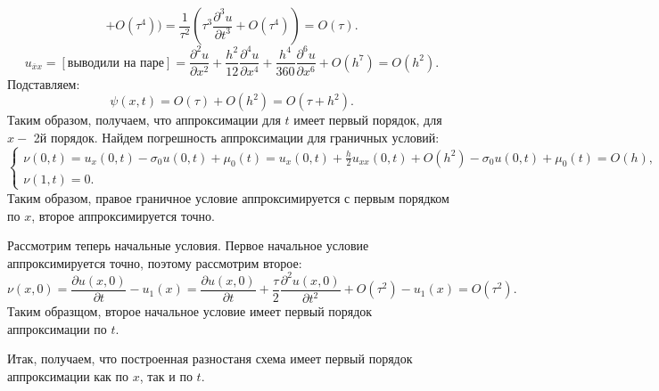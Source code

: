 \documentclass[11pt]{article}
\begin{document}
$$+O(\tau^4))=\frac{1}{\tau^2}(\tau^3\frac{\partial^3 u}{\partial t^3}+O(\tau^4))=O(\tau).$$
$$u_{\overline{x}x}=[\text{выводили на паре}]=\frac{\partial^2 u}{\partial x^2}+\frac{h^2}{12}\frac{\partial^4 u}{\partial x^4}+\frac{h^4}{360}\frac{\partial^6 u}{\partial x^6}+O(h^7)=O(h^2).$$
Подставляем:
$$\psi(x,t)=O(\tau)+O(h^2)=O(\tau+h^2).$$
Таким образом, получаем, что аппроксимации для $t$ имеет первый порядок, для $x-$ 2й порядок.
Найдем погрешность аппроксимации для граничных условий:
$$\begin{cases}
    \nu(0,t)=u_x(0,t)-\sigma_0u(0,t)+\mu_0(t)=u_x(0,t)+\frac{h}{2}u_{xx}(0,t)+O(h^2)-\sigma_0u(0,t)+\mu_0(t)=O(h),\\
    \nu(1,t)=0.
\end{cases}$$
Таким образом, правое граничное условие аппроксимируется с первым порядком по $x$, второе аппроксимируется точно.

Рассмотрим теперь начальные условия. Первое начальное условие аппроксимируется точно, поэтому рассмотрим второе:
$$\nu(x,0)=\frac{\partial u(x,0)}{\partial t}-u_1(x)=\frac{\partial u(x,0)}{\partial t}+\frac{\tau}{2}\frac{\partial^2 u(x,0)}{\partial t^2}+O(\tau^2)-u_1(x)=O(\tau^2).$$
Таким образщом, второе начальное условие имеет первый порядок аппроксимации по $t$. 

Итак, получаем, что построенная разностаня схема имеет первый порядок аппроксимации как по $x$, так и по $t$.
\end{document}
